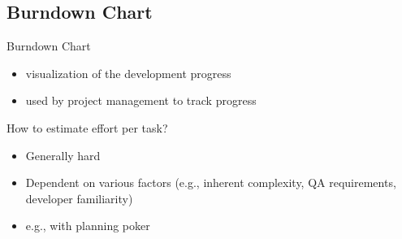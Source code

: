\subsection{Burndown Chart}
\begin{frame}{\insertsubsection}
	\begin{fancycolumns}[widths={70}]
		\begin{exampletight}{}
		\end{exampletight}
	\nextcolumn
		\begin{definition}{Burndown Chart}
			\begin{itemize}
				\item visualization of the development progress
				\item used by project management to track progress
			\end{itemize}
		\end{definition}
		\begin{note}{How to estimate effort per task?}
			\begin{itemize}
				\item Generally hard
				\item Dependent on various factors (e.g., inherent complexity, QA requirements, developer familiarity)
				\item e.g., with planning poker
			\end{itemize}
		\end{note}
	\end{fancycolumns}
\end{frame}

